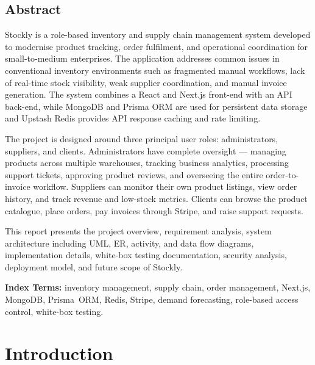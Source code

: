 \documentclass[12pt,a4paper]{report}
\begin{document}
\clearpage
\section*{Abstract}

Stockly is a role-based inventory and supply chain management system developed to modernise product tracking, order fulfilment, and operational coordination for small-to-medium enterprises. The application addresses common issues in conventional inventory environments such as fragmented manual workflows, lack of real-time stock visibility, weak supplier coordination, and manual invoice generation. The system combines a React and Next.js front-end with an API back-end, while MongoDB and Prisma ORM are used for persistent data storage and Upstash Redis provides API response caching and rate limiting.

The project is designed around three principal user roles: administrators, suppliers, and clients. Administrators have complete oversight --- managing products across multiple warehouses, tracking business analytics, processing support tickets, approving product reviews, and overseeing the entire order-to-invoice workflow. Suppliers can monitor their own product listings, view order history, and track revenue and low-stock metrics. Clients can browse the product catalogue, place orders, pay invoices through Stripe, and raise support requests.

This report presents the project overview, requirement analysis, system architecture including UML, ER, activity, and data flow diagrams, implementation details, white-box testing documentation, security analysis, deployment model, and future scope of Stockly.

\noindent\textbf{Index Terms:} inventory management, supply chain, order management, Next.js, MongoDB, Prisma~ORM, Redis, Stripe, demand forecasting, role-based access control, white-box testing.

\tableofcontents
\clearpage
{}

\chapter{Introduction}
\end{document}
